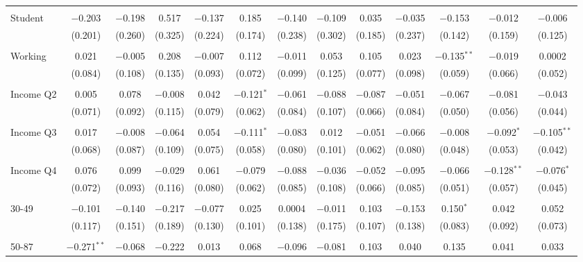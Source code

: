 \begin{tabular}{@{\extracolsep{5pt}}lcccccccccccc}
  & & & & & & & & & & & & \\ 
 Student & $-$0.203 & $-$0.198 & 0.517 & $-$0.137 & 0.185 & $-$0.140 & $-$0.109 & 0.035 & $-$0.035 & $-$0.153 & $-$0.012 & $-$0.006 \\ 
  & (0.201) & (0.260) & (0.325) & (0.224) & (0.174) & (0.238) & (0.302) & (0.185) & (0.237) & (0.142) & (0.159) & (0.125) \\ 
  & & & & & & & & & & & & \\ 
 Working & 0.021 & $-$0.005 & 0.208 & $-$0.007 & 0.112 & $-$0.011 & 0.053 & 0.105 & 0.023 & $-$0.135$^{**}$ & $-$0.019 & 0.0002 \\ 
  & (0.084) & (0.108) & (0.135) & (0.093) & (0.072) & (0.099) & (0.125) & (0.077) & (0.098) & (0.059) & (0.066) & (0.052) \\ 
  & & & & & & & & & & & & \\ 
 Income Q2 & 0.005 & 0.078 & $-$0.008 & 0.042 & $-$0.121$^{*}$ & $-$0.061 & $-$0.088 & $-$0.087 & $-$0.051 & $-$0.067 & $-$0.081 & $-$0.043 \\ 
  & (0.071) & (0.092) & (0.115) & (0.079) & (0.062) & (0.084) & (0.107) & (0.066) & (0.084) & (0.050) & (0.056) & (0.044) \\ 
  & & & & & & & & & & & & \\ 
 Income Q3 & 0.017 & $-$0.008 & $-$0.064 & 0.054 & $-$0.111$^{*}$ & $-$0.083 & 0.012 & $-$0.051 & $-$0.066 & $-$0.008 & $-$0.092$^{*}$ & $-$0.105$^{**}$ \\ 
  & (0.068) & (0.087) & (0.109) & (0.075) & (0.058) & (0.080) & (0.101) & (0.062) & (0.080) & (0.048) & (0.053) & (0.042) \\ 
  & & & & & & & & & & & & \\ 
 Income Q4 & 0.076 & 0.099 & $-$0.029 & 0.061 & $-$0.079 & $-$0.088 & $-$0.036 & $-$0.052 & $-$0.095 & $-$0.066 & $-$0.128$^{**}$ & $-$0.076$^{*}$ \\ 
  & (0.072) & (0.093) & (0.116) & (0.080) & (0.062) & (0.085) & (0.108) & (0.066) & (0.085) & (0.051) & (0.057) & (0.045) \\ 
  & & & & & & & & & & & & \\ 
 30-49 & $-$0.101 & $-$0.140 & $-$0.217 & $-$0.077 & 0.025 & 0.0004 & $-$0.011 & 0.103 & $-$0.153 & 0.150$^{*}$ & 0.042 & 0.052 \\ 
  & (0.117) & (0.151) & (0.189) & (0.130) & (0.101) & (0.138) & (0.175) & (0.107) & (0.138) & (0.083) & (0.092) & (0.073) \\ 
  & & & & & & & & & & & & \\ 
 50-87 & $-$0.271$^{**}$ & $-$0.068 & $-$0.222 & 0.013 & 0.068 & $-$0.096 & $-$0.081 & 0.103 & 0.040 & 0.135 & 0.041 & 0.033 \\ 

\end{tabular}
